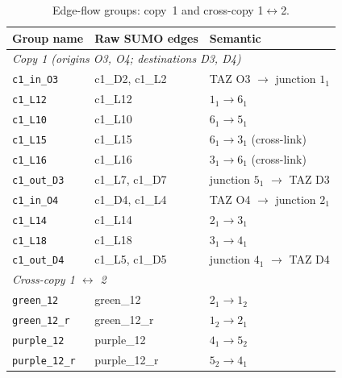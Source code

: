 \documentclass[11pt]{article}
\begin{document}
\begin{table}[h]
\centering
\caption{Edge-flow groups: copy~1 and cross-copy 1$\leftrightarrow$2.}
\label{tab:groups_grid3_c1}
\begin{tabular}{lll}
\hline
\textbf{Group name} & \textbf{Raw SUMO edges} & \textbf{Semantic} \\
\hline
\multicolumn{3}{l}{\textit{Copy 1 (origins O3, O4; destinations D3, D4)}} \\
\texttt{c1\_in\_O3}  & c1\_D2, c1\_L2           & TAZ O3 $\to$ junction $1_1$ \\
\texttt{c1\_L12}     & c1\_L12                  & $1_1 \to 6_1$ \\
\texttt{c1\_L10}     & c1\_L10                  & $6_1 \to 5_1$ \\
\texttt{c1\_L15}     & c1\_L15                  & $6_1 \to 3_1$ (cross-link) \\
\texttt{c1\_L16}     & c1\_L16                  & $3_1 \to 6_1$ (cross-link) \\
\texttt{c1\_out\_D3} & c1\_L7, c1\_D7           & junction $5_1$ $\to$ TAZ D3 \\
\texttt{c1\_in\_O4}  & c1\_D4, c1\_L4           & TAZ O4 $\to$ junction $2_1$ \\
\texttt{c1\_L14}     & c1\_L14                  & $2_1 \to 3_1$ \\
\texttt{c1\_L18}     & c1\_L18                  & $3_1 \to 4_1$ \\
\texttt{c1\_out\_D4} & c1\_L5, c1\_D5           & junction $4_1$ $\to$ TAZ D4 \\
\hline
\multicolumn{3}{l}{\textit{Cross-copy 1 $\leftrightarrow$ 2}} \\
\texttt{green\_12}   & green\_12                & $2_1 \to 1_2$ \\
\texttt{green\_12\_r}& green\_12\_r             & $1_2 \to 2_1$ \\
\texttt{purple\_12}  & purple\_12               & $4_1 \to 5_2$ \\
\texttt{purple\_12\_r}& purple\_12\_r           & $5_2 \to 4_1$ \\
\hline
\end{tabular}
\end{table}
\end{document}
